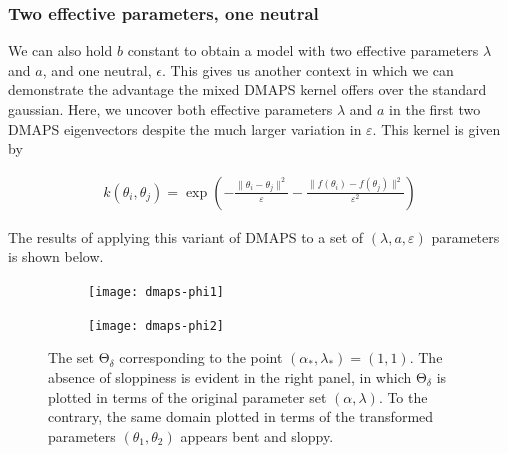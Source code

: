 \documentclass[11pt]{article}
\newcommand{\ps}{\mathrm{\Theta}}
\newcommand{\p}{\theta}
\newcommand{\eps}{\varepsilon}
\begin{document}
\subsubsection{Two effective parameters, one neutral}

We can also hold $b$ constant to obtain a model with two effective
parameters $\lambda$ and $a$, and one neutral, $\epsilon$. This gives
us another context in which we can demonstrate the advantage the mixed DMAPS
kernel offers over the standard gaussian. Here, we uncover both
effective parameters $\lambda$ and $a$ in the first two DMAPS
eigenvectors despite the much larger variation in $\eps$. This kernel
is given by

\begin{align*}
  k(\theta_i, \theta_j) = \exp(- \frac{\|\theta_i -
  \theta_j\|^2}{\eps}  - \frac{\|f(\theta_i) - f(\theta_j)\|^2}{\eps^2})
\end{align*}

The results of applying this variant of DMAPS to a set of $(\lambda,
a, \eps)$ parameters is shown below.


\begin{figure}[ht!]
  \begin{subfigure}[t]{0.49\textwidth}
    \centering
    \texttt{[image: dmaps-phi1]}
  \end{subfigure}
  \begin{subfigure}[t]{0.49\textwidth}
    \centering
    \texttt{[image: dmaps-phi2]}
  \end{subfigure} %
  \caption{The set $\ps_\delta$ corresponding to the point
    $(\alpha_*,\lambda_*) = (1,1)$. The absence of
    sloppiness is evident in the right panel, in which $\ps_\delta$ is
    plotted in terms of the original parameter set
    $(\alpha,\lambda)$. To the contrary, the same domain plotted in
    terms of the transformed parameters $(\p_1,\p_2)$ appears bent and
    sloppy. \label{f.transf-params}}
\end{figure}

% 
% 
\end{document}
